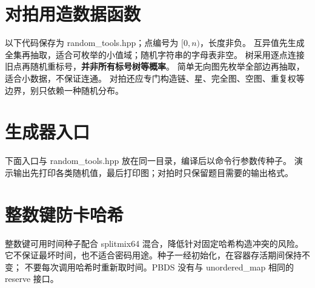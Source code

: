 \newpage
\section{对拍用造数据函数}
以下代码保存为 random\_tools.hpp；点编号为 $[0,n)$，长度非负。
互异值先生成全集再抽取，适合可枚举的小值域；随机字符串的字母表非空。
树采用逐点连接旧点再随机重标号，\textbf{并非所有标号树等概率}。
简单无向图先枚举全部边再抽取，适合小数据，不保证连通。
对拍还应专门构造链、星、完全图、空图、重复权等边界，别只依赖一种随机分布。

\newpage


\section{生成器入口}
下面入口与 random\_tools.hpp 放在同一目录，编译后以命令行参数传种子。
演示输出先打印各类随机值，最后打印图；对拍时只保留题目需要的输出格式。

\newpage
\section{整数键防卡哈希}
整数键可用时间种子配合 splitmix64 混合，降低针对固定哈希构造冲突的风险。
它不保证最坏时间，也不适合密码用途。种子一经初始化，在容器存活期间保持不变；
不要每次调用哈希时重新取时间。PBDS 没有与 unordered\_map 相同的 reserve 接口。

